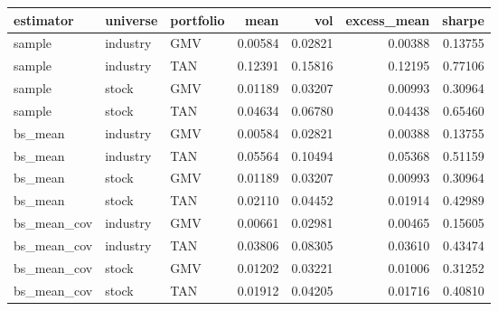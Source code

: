 \begin{tabular}{lllrrrr}
\toprule
estimator & universe & portfolio & mean & vol & excess\_mean & sharpe \\
\midrule
sample & industry & GMV & 0.00584 & 0.02821 & 0.00388 & 0.13755 \\
sample & industry & TAN & 0.12391 & 0.15816 & 0.12195 & 0.77106 \\
sample & stock & GMV & 0.01189 & 0.03207 & 0.00993 & 0.30964 \\
sample & stock & TAN & 0.04634 & 0.06780 & 0.04438 & 0.65460 \\
bs\_mean & industry & GMV & 0.00584 & 0.02821 & 0.00388 & 0.13755 \\
bs\_mean & industry & TAN & 0.05564 & 0.10494 & 0.05368 & 0.51159 \\
bs\_mean & stock & GMV & 0.01189 & 0.03207 & 0.00993 & 0.30964 \\
bs\_mean & stock & TAN & 0.02110 & 0.04452 & 0.01914 & 0.42989 \\
bs\_mean\_cov & industry & GMV & 0.00661 & 0.02981 & 0.00465 & 0.15605 \\
bs\_mean\_cov & industry & TAN & 0.03806 & 0.08305 & 0.03610 & 0.43474 \\
bs\_mean\_cov & stock & GMV & 0.01202 & 0.03221 & 0.01006 & 0.31252 \\
bs\_mean\_cov & stock & TAN & 0.01912 & 0.04205 & 0.01716 & 0.40810 \\
\bottomrule
\end{tabular}
